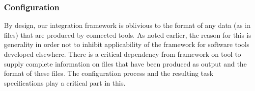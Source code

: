 \documentclass{article}
\begin{document}

  \subsubsection{Configuration} \label{ss:implementation_configuration}



   By design, our integration framework is oblivious to the format of any data
   (as in files) that are produced by connected tools. As noted earlier, the
   reason for this is generality in order not to inhibit applicability of the
   framework for software tools developed elsewhere. There is a critical
   dependency from framework on tool to supply complete information on files
   that have been produced as output and the format of these files. The
   configuration process and the resulting task specifications play a critical
   part in this.
\end{document}
